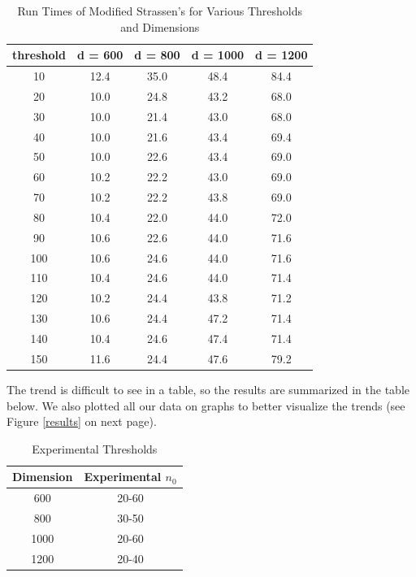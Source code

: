 \documentclass[12pt]{article}
\begin{document}
\begin{table}[h]
\centering
{\setlength{\tabcolsep}{15pt}
\begin{tabular}{c|c|c|c|c}
threshold & d = 600 & d = 800 & d = 1000 & d = 1200 \\\hline
10 & 12.4 & 35.0 & 48.4 & 84.4 \\
20 & 10.0 & 24.8 & 43.2 & 68.0 \\
30 & 10.0 & 21.4 & 43.0 & 68.0 \\
40 & 10.0 & 21.6 & 43.4 & 69.4 \\
50 & 10.0 & 22.6 & 43.4 & 69.0 \\
60 & 10.2 & 22.2 & 43.0 & 69.0 \\
70 & 10.2 & 22.2 & 43.8 & 69.0 \\
80 & 10.4 & 22.0 & 44.0 & 72.0 \\
90 & 10.6 & 22.6 & 44.0 & 71.6 \\
100 & 10.6 & 24.6 & 44.0 & 71.6 \\
110 & 10.4 & 24.6 & 44.0 & 71.4 \\
120 & 10.2 & 24.4 & 43.8 & 71.2 \\
130 & 10.6 & 24.4 & 47.2 & 71.4 \\
140 & 10.4 & 24.6 & 47.4 & 71.4 \\
150 & 11.6 & 24.4 & 47.6 & 79.2 \\
\end{tabular}}
\caption{Run Times of Modified Strassen's for Various Thresholds and Dimensions}
\end{table}

The trend is difficult to see in a table, so the results are summarized in the table below. We also plotted all our data on graphs to better visualize the trends (see Figure \ref{results} on next page).

\begin{table}[h]
\centering
{\setlength{\tabcolsep}{15pt}
\begin{tabular}{c|c}
Dimension & Experimental $n_0$ \\\hline
600 & 20-60 \\
800 & 30-50 \\
1000 & 20-60 \\
1200 & 20-40 \\
\end{tabular}}
\caption{Experimental Thresholds}
\end{table}
\end{document}

